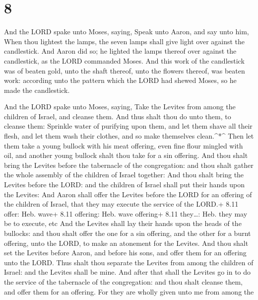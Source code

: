 \hypertarget{section-7}{%
\section{8}\label{section-7}}

 And the LORD spake unto Moses, saying,  Speak
unto Aaron, and say unto him, When thou lightest the lamps, the seven
lamps shall give light over against the candlestick.  And
Aaron did so; he lighted the lamps thereof over against the candlestick,
as the LORD commanded Moses.  And this work of the
candlestick was of beaten gold, unto the shaft thereof, unto the flowers
thereof, was beaten work: according unto the pattern which the LORD had
shewed Moses, so he made the candlestick.

 And the LORD spake unto Moses, saying,  Take
the Levites from among the children of Israel, and cleanse them.
 And thus shalt thou do unto them, to cleanse them: Sprinkle
water of purifying upon them, and let them shave all their flesh, and
let them wash their clothes, and so make themselves clean.\^{}*\^{}
 Then let them take a young bullock with his meat offering,
even fine flour mingled with oil, and another young bullock shalt thou
take for a sin offering.  And thou shalt bring the Levites
before the tabernacle of the congregation: and thou shalt gather the
whole assembly of the children of Israel together:  And
thou shalt bring the Levites before the LORD: and the children of Israel
shall put their hands upon the Levites:  And Aaron shall
offer the Levites before the LORD for an offering of the children of
Israel, that they may execute the service of the LORD.+ 8.11 offer: Heb.
wave+ 8.11 offering: Heb. wave offering+ 8.11 they\ldots: Heb. they may
be to execute, etc  And the Levites shall lay their hands
upon the heads of the bullocks: and thou shalt offer the one for a sin
offering, and the other for a burnt offering, unto the LORD, to make an
atonement for the Levites.  And thou shalt set the Levites
before Aaron, and before his sons, and offer them for an offering unto
the LORD.  Thus shalt thou separate the Levites from among
the children of Israel: and the Levites shall be mine.  And
after that shall the Levites go in to do the service of the tabernacle
of the congregation: and thou shalt cleanse them, and offer them for an
offering.  For they are wholly given unto me from among the
